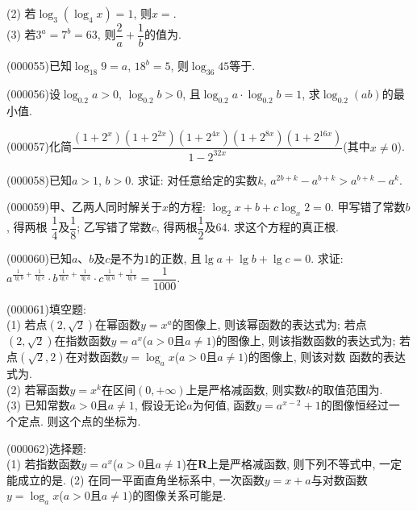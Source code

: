 (2) 若$\log_3(\log_4 x)=1$, 则$x=$.\\
(3) 若$3^a=7^b=63$, 则$\dfrac 2a+\dfrac 1b$的值为.\\
\item (000055)已知$\log_{18}9=a$, $18^b=5$, 则$\log_{36}45$等于.
\item (000056)设$\log_{0.2}a>0$, $\log_{0.2}b>0$, 且$\log_{0.2}a\cdot \log_{0.2}b=1$, 求$\log_{0.2}(ab)$的最小值.
\item (000057)化简$\dfrac{(1+2^x)(1+2^{2x})(1+2^{4x})(1+2^{8x})(1+2^{16x})}{1-2^{32x}}$(其中$x\ne 0$).
\item (000058)已知$a>1$, $b>0$. 求证: 对任意给定的实数$k$, $a^{2b+k}-a^{b+k}>a^{b+k}-a^k$.
\item (000059)甲、乙两人同时解关于$x$的方程: $\log_2x+b+c\log_x2=0$. 甲写错了常数$b$, 得两根
$\dfrac 14$及$\dfrac 18$; 乙写错了常数$c$, 得两根$\dfrac 12$及$64$. 求这个方程的真正根.
\item (000060)已知$a$、$b$及$c$是不为$1$的正数, 且$\lg a+\lg b+\lg c=0$. 求证: $a^{\frac{1}{\lg b}+\frac{1}{\lg c}}\cdot b^{\frac{1}{\lg c}+\frac{1}{\lg a}}\cdot c^{\frac{1}{\lg a}+\frac{1}{\lg b}}=\dfrac{1}{1000}$.
\item (000061)填空题:\\
(1) 若点$(2, \sqrt 2)$在幂函数$y=x^a$的图像上, 则该幂函数的表达式为; 若点$(2, \sqrt 2)$在指数函数$y=a^x$($a>0$且$a\ne 1$)的图像上, 则该指数函数的表达式为; 若点$(\sqrt 2, 2)$在对数函数$y=\log_a x$($a>0$且$a\ne 1$)的图像上, 则该对数
函数的表达式为.\\
(2) 若幂函数$y=x^k$在区间$(0, +\infty)$上是严格减函数, 则实数$k$的取值范围为.\\
(3) 已知常数$a>0$且$a\ne 1$, 假设无论$a$为何值, 函数$y=a^{x-2}+1$的图像恒经过一
个定点. 则这个点的坐标为.
\item (000062)选择题:\\
(1) 若指数函数$y=a^x$($a>0$且$a\ne 1$)在$\mathbf{R}$上是严格减函数, 则下列不等式中, 一定能成立的是.
(2) 在同一平面直角坐标系中, 一次函数$y=x+a$与对数函数$y=\log_ax$($a>0$且$a\ne 1$)的图像关系可能是.
